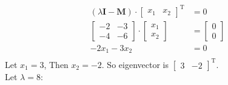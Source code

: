 \documentclass{article}
\begin{document}
\begin{itemize}
\begin{align*}
(\lambda \bm{I} - \bm{M}) \cdot \begin{bmatrix}
			x_{1} & x_{2}
		\end{bmatrix}^\mathrm{T} &= 0\\
		\begin{bmatrix}
			-2 & -3 \\
			-4 & -6
		\end{bmatrix} \cdot 
		\begin{bmatrix}
			x_{1} \\
			x_{2}
		\end{bmatrix}&= 
			\begin{bmatrix}
				0 \\ 0
			\end{bmatrix}\\
			-2x_{1} - 3x_{2} &= 0\\
\end{align*}
Let $x_{1} = 3$, Then $x_{2} = -2$. So eigenvector is $\begin{bmatrix}
	3 & -2
\end{bmatrix}^{\mathrm{T}}.$\\
Let $\lambda = 8$:\\


\end{itemize}
\end{document}
